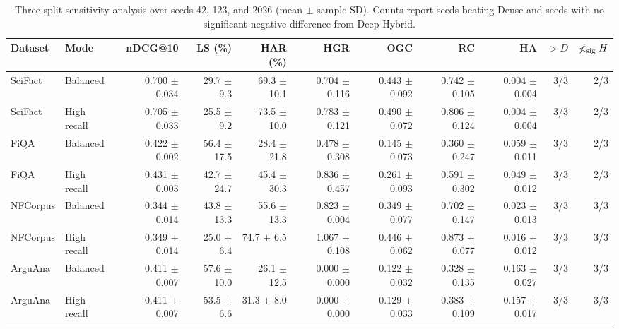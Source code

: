 \begin{table}[t]
\centering
\caption{Three-split sensitivity analysis over seeds 42, 123, and 2026 (mean $\pm$ sample SD). Counts report seeds beating Dense and seeds with no significant negative difference from Deep Hybrid.}
\label{tab:multiseed_summary}
\scriptsize
\setlength{\tabcolsep}{2.7pt}
\begin{tabular}{llrrrrrrrrr}
\toprule
Dataset & Mode & nDCG@10 & LS (\%) & HAR (\%) & HGR & OGC & RC & HA & $>{D}$ & $\not<_{\rm sig}H$ \\
\midrule
SciFact & Balanced & 0.700 $\pm$ 0.034 & 29.7 $\pm$ 9.3 & 69.3 $\pm$ 10.1 & 0.704 $\pm$ 0.116 & 0.443 $\pm$ 0.092 & 0.742 $\pm$ 0.105 & 0.004 $\pm$ 0.004 & 3/3 & 2/3 \\
SciFact & High recall & 0.705 $\pm$ 0.033 & 25.5 $\pm$ 9.2 & 73.5 $\pm$ 10.0 & 0.783 $\pm$ 0.121 & 0.490 $\pm$ 0.072 & 0.806 $\pm$ 0.124 & 0.004 $\pm$ 0.004 & 3/3 & 2/3 \\
\addlinespace[1pt]
FiQA & Balanced & 0.422 $\pm$ 0.002 & 56.4 $\pm$ 17.5 & 28.4 $\pm$ 21.8 & 0.478 $\pm$ 0.308 & 0.145 $\pm$ 0.073 & 0.360 $\pm$ 0.247 & 0.059 $\pm$ 0.011 & 3/3 & 2/3 \\
FiQA & High recall & 0.431 $\pm$ 0.003 & 42.7 $\pm$ 24.7 & 45.4 $\pm$ 30.3 & 0.836 $\pm$ 0.457 & 0.261 $\pm$ 0.093 & 0.591 $\pm$ 0.302 & 0.049 $\pm$ 0.012 & 3/3 & 2/3 \\
\addlinespace[1pt]
NFCorpus & Balanced & 0.344 $\pm$ 0.014 & 43.8 $\pm$ 13.3 & 55.6 $\pm$ 13.3 & 0.823 $\pm$ 0.004 & 0.349 $\pm$ 0.077 & 0.702 $\pm$ 0.147 & 0.023 $\pm$ 0.013 & 3/3 & 3/3 \\
NFCorpus & High recall & 0.349 $\pm$ 0.014 & 25.0 $\pm$ 6.4 & 74.7 $\pm$ 6.5 & 1.067 $\pm$ 0.108 & 0.446 $\pm$ 0.062 & 0.873 $\pm$ 0.077 & 0.016 $\pm$ 0.012 & 3/3 & 3/3 \\
\addlinespace[1pt]
ArguAna & Balanced & 0.411 $\pm$ 0.007 & 57.6 $\pm$ 10.0 & 26.1 $\pm$ 12.5 & 0.000 $\pm$ 0.000 & 0.122 $\pm$ 0.032 & 0.328 $\pm$ 0.135 & 0.163 $\pm$ 0.027 & 3/3 & 3/3 \\
ArguAna & High recall & 0.411 $\pm$ 0.007 & 53.5 $\pm$ 6.6 & 31.3 $\pm$ 8.0 & 0.000 $\pm$ 0.000 & 0.129 $\pm$ 0.033 & 0.383 $\pm$ 0.109 & 0.157 $\pm$ 0.017 & 3/3 & 3/3 \\
\bottomrule
\end{tabular}
\end{table}
